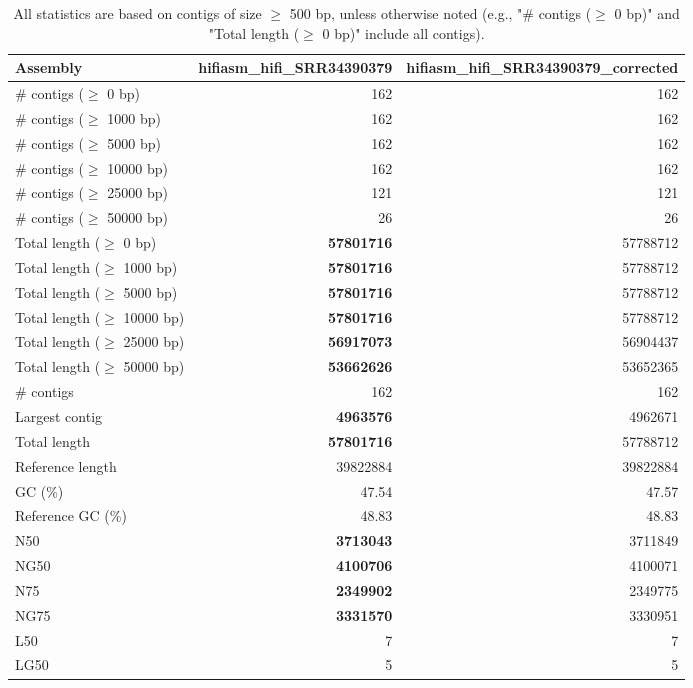 \documentclass[12pt,a4paper]{article}
\begin{document}
\begin{table}[ht]
\begin{center}
\caption{All statistics are based on contigs of size $\geq$ 500 bp, unless otherwise noted (e.g., "\# contigs ($\geq$ 0 bp)" and "Total length ($\geq$ 0 bp)" include all contigs).}
\begin{tabular}{|l*{2}{|r}|}
\hline
Assembly & hifiasm\_hifi\_SRR34390379 & hifiasm\_hifi\_SRR34390379\_corrected \\ \hline
\# contigs ($\geq$ 0 bp) & 162 & 162 \\ \hline
\# contigs ($\geq$ 1000 bp) & 162 & 162 \\ \hline
\# contigs ($\geq$ 5000 bp) & 162 & 162 \\ \hline
\# contigs ($\geq$ 10000 bp) & 162 & 162 \\ \hline
\# contigs ($\geq$ 25000 bp) & 121 & 121 \\ \hline
\# contigs ($\geq$ 50000 bp) & 26 & 26 \\ \hline
Total length ($\geq$ 0 bp) & {\bf 57801716} & 57788712 \\ \hline
Total length ($\geq$ 1000 bp) & {\bf 57801716} & 57788712 \\ \hline
Total length ($\geq$ 5000 bp) & {\bf 57801716} & 57788712 \\ \hline
Total length ($\geq$ 10000 bp) & {\bf 57801716} & 57788712 \\ \hline
Total length ($\geq$ 25000 bp) & {\bf 56917073} & 56904437 \\ \hline
Total length ($\geq$ 50000 bp) & {\bf 53662626} & 53652365 \\ \hline
\# contigs & 162 & 162 \\ \hline
Largest contig & {\bf 4963576} & 4962671 \\ \hline
Total length & {\bf 57801716} & 57788712 \\ \hline
Reference length & 39822884 & 39822884 \\ \hline
GC (\%) & 47.54 & 47.57 \\ \hline
Reference GC (\%) & 48.83 & 48.83 \\ \hline
N50 & {\bf 3713043} & 3711849 \\ \hline
NG50 & {\bf 4100706} & 4100071 \\ \hline
N75 & {\bf 2349902} & 2349775 \\ \hline
NG75 & {\bf 3331570} & 3330951 \\ \hline
L50 & 7 & 7 \\ \hline
LG50 & 5 & 5 \\ \hline

\end{tabular}
\end{center}
\end{table}
\end{document}
